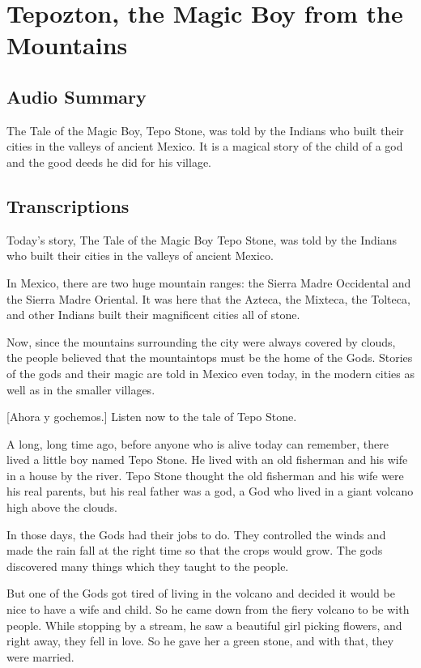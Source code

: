 \section{Tepozton, the Magic Boy from the Mountains}

\subsection{Audio Summary}

The Tale of the Magic Boy, Tepo Stone, was told by the Indians who built their cities in the valleys of ancient Mexico.
It is a magical story of the child of a god and the good deeds he did for his village.

\subsection{Transcriptions}

Today's story, The Tale of the Magic Boy Tepo Stone, was told by the Indians who built their cities in the valleys of ancient Mexico.

In Mexico, there are two huge mountain ranges: the Sierra Madre Occidental and the Sierra Madre Oriental. It was here that the Azteca, the Mixteca, the Tolteca, and other Indians built their magnificent cities all of stone.

Now, since the mountains surrounding the city were always covered by clouds, the people believed that the mountaintops must be the home of the Gods. Stories of the gods and their magic are told in Mexico even today, in the modern cities as well as in the smaller villages.

    [Ahora y gochemos.] Listen now to the tale of Tepo Stone.

A long, long time ago, before anyone who is alive today can remember, there lived a little boy named Tepo Stone. He lived with an old fisherman and his wife in a house by the river. Tepo Stone thought the old fisherman and his wife were his real parents, but his real father was a god, a God who lived in a giant volcano high above the clouds.

In those days, the Gods had their jobs to do. They controlled the winds and made the rain fall at the right time so that the crops would grow. The gods discovered many things which they taught to the people.

But one of the Gods got tired of living in the volcano and decided it would be nice to have a wife and child. So he came down from the fiery volcano to be with people. While stopping by a stream, he saw a beautiful girl picking flowers, and right away, they fell in love. So he gave her a green stone, and with that, they were married.


